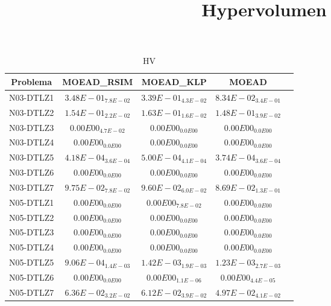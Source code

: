 \documentclass{article}
\title{Hypervolumen}
\author{}
\begin{document}
\maketitle
\begin{table*}[ht!]
\scriptsize
\caption{HV}
\centering\begin{tabular}{|c||c||c||c||c|} \hline
Problema &MOEAD_RSIM &MOEAD_KLP &MOEAD\\\hline
N03-DTLZ1 &\cellcolor{gray95}$3.48E-01_{7.8E-02}$ &\cellcolor{gray25}$3.39E-01_{4.3E-02}$ &$8.34E-02_{3.4E-01}$\\ 
\hline
N03-DTLZ2 &\cellcolor{gray25}$1.54E-01_{2.2E-02}$ &\cellcolor{gray95}$1.63E-01_{1.6E-02}$ &$1.48E-01_{3.9E-02}$\\ 
\hline
N03-DTLZ3 &$0.00E00_{4.7E-02}$ &\cellcolor{gray95}$0.00E00_{0.0E00}$ &\cellcolor{gray25}$0.00E00_{0.0E00}$\\ 
\hline
N03-DTLZ4 &\cellcolor{gray95}$0.00E00_{0.0E00}$ &\cellcolor{gray25}$0.00E00_{0.0E00}$ &$0.00E00_{0.0E00}$\\ 
\hline
N03-DTLZ5 &\cellcolor{gray25}$4.18E-04_{3.6E-04}$ &\cellcolor{gray95}$5.00E-04_{4.1E-04}$ &$3.74E-04_{3.6E-04}$\\ 
\hline
N03-DTLZ6 &\cellcolor{gray95}$0.00E00_{0.0E00}$ &\cellcolor{gray25}$0.00E00_{0.0E00}$ &$0.00E00_{0.0E00}$\\ 
\hline
N03-DTLZ7 &\cellcolor{gray95}$9.75E-02_{7.8E-02}$ &\cellcolor{gray25}$9.60E-02_{6.0E-02}$ &$8.69E-02_{1.3E-01}$\\ 
\hline
N05-DTLZ1 &\cellcolor{gray95}$0.00E00_{0.0E00}$ &$0.00E00_{7.8E-02}$ &\cellcolor{gray25}$0.00E00_{0.0E00}$\\ 
\hline
N05-DTLZ2 &\cellcolor{gray95}$0.00E00_{0.0E00}$ &\cellcolor{gray25}$0.00E00_{0.0E00}$ &$0.00E00_{0.0E00}$\\ 
\hline
N05-DTLZ3 &\cellcolor{gray95}$0.00E00_{0.0E00}$ &\cellcolor{gray25}$0.00E00_{0.0E00}$ &$0.00E00_{0.0E00}$\\ 
\hline
N05-DTLZ4 &\cellcolor{gray95}$0.00E00_{0.0E00}$ &\cellcolor{gray25}$0.00E00_{0.0E00}$ &$0.00E00_{0.0E00}$\\ 
\hline
N05-DTLZ5 &$9.06E-04_{1.4E-03}$ &\cellcolor{gray95}$1.42E-03_{1.9E-03}$ &\cellcolor{gray25}$1.23E-03_{2.7E-03}$\\ 
\hline
N05-DTLZ6 &\cellcolor{gray95}$0.00E00_{0.0E00}$ &\cellcolor{gray25}$0.00E00_{1.1E-06}$ &$0.00E00_{4.4E-05}$\\ 
\hline
N05-DTLZ7 &\cellcolor{gray95}$6.36E-02_{3.2E-02}$ &\cellcolor{gray25}$6.12E-02_{3.9E-02}$ &$4.97E-02_{4.1E-02}$\\ 

\end{tabular}
\end{table*}
\end{document}
